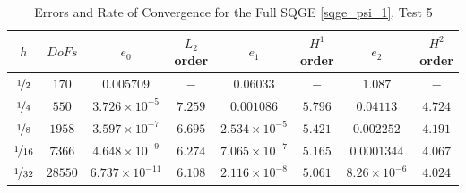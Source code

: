 \begin{table}%
\begin{center}
\begin{tabular}{|c|c|c|c|c|c|c|c|}%
  \hline
  $h$ & $DoFs$ & $e_0$ & $L_2$ order & $e_1$ & $H^1$ order & $e_2$ & $H^2$ order \\[0.2em] %
  \hline
  $\nicefrac{1}{2}$ & $170$ & $0.005709$ & $-$ & $0.06033$ & $-$ & $1.087$ & $-$ \\[0.2em] %
  $\nicefrac{1}{4}$ & $550$ & $3.726\times 10^{-5}$ & $7.259$ & $0.001086$ & $5.796$ & $0.04113$ & $4.724$ \\[0.2em] %
  $\nicefrac{1}{8}$ & $1958$ & $3.597\times 10^{-7}$ & $6.695$ & $2.534\times 10^{-5}$ & $5.421$ & $0.002252$ & $4.191$ \\[0.2em] %
  $\nicefrac{1}{16}$ & $7366$ & $4.648\times 10^{-9}$ & $6.274$ & $7.065\times 10^{-7}$ & $5.165$ & $0.0001344$ & $4.067$\\[0.2em] %
  $\nicefrac{1}{32}$ & $28550$ & $6.737\times 10^{-11}$ & $6.108$ & $2.116\times 10^{-8}$ & $5.061$ & $8.26\times 10^{-6}$ & $4.024$ \\[0.2em] %
 \hline
\end{tabular}
\end{center}
\caption{Errors and Rate of Convergence for the Full SQGE \eqref{sqge_psi_1}, Test 5}
\label{tab:SQGEsinErrors}
\end{table}

